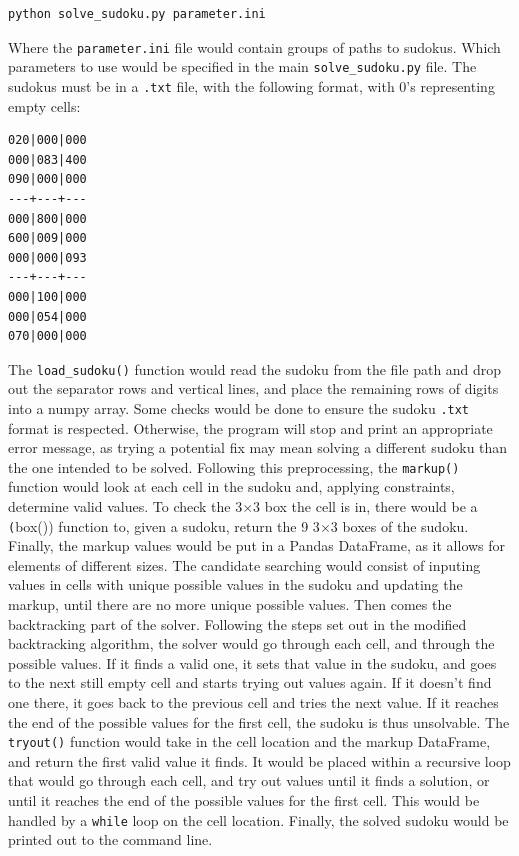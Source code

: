 \documentclass[12pt]{report} %
\begin{document}
\begin{lstlisting}[language=bash]
  python solve_sudoku.py parameter.ini
\end{lstlisting}

Where the \texttt{parameter.ini} file would contain groups of paths to sudokus. Which parameters to use would be specified in the main \texttt{solve\_sudoku.py} file. The sudokus must be in a \texttt{.txt} file, with the following format, with 0's representing empty cells:

\vspace*{1\baselineskip}
\begin{lstlisting}[caption = {Sudoku input format example}]
020|000|000
000|083|400
090|000|000
---+---+---
000|800|000
600|009|000
000|000|093
---+---+---
000|100|000
000|054|000
070|000|000
\end{lstlisting}

\vspace*{1\baselineskip}
The \texttt{load\_sudoku()} function would read the sudoku from the file path and drop out the separator rows and vertical lines, and place the remaining rows of digits into a numpy array. Some checks would be done to ensure the sudoku \texttt{.txt} format is respected. Otherwise, the program will stop and print an appropriate error message, as trying a potential fix may mean solving a different sudoku than the one intended to be solved.
Following this preprocessing, the \texttt{markup()} function would look at each cell in the sudoku and, applying constraints, determine valid values. To check the 3$\times$3 box the cell is in, there would be a \texttt(box()) function to, given a sudoku, return the 9 3$\times$3 boxes of the sudoku. Finally, the markup values would be put in a Pandas DataFrame, as it allows for elements of different sizes.
The candidate searching would consist of inputing values in cells with unique possible values in the sudoku and updating the markup, until there are no more unique possible values.
Then comes the backtracking part of the solver. Following the steps set out in the modified backtracking algorithm, the solver would go through each cell, and through the possible values. If it finds a valid one, it sets that value in the sudoku, and goes to the next still empty cell and starts trying out values again. If it doesn't find one there, it goes back to the previous cell and tries the next value. If it reaches the end of the possible values for the first cell, the sudoku is thus unsolvable. The \texttt{tryout()} function would take in the cell location and the markup DataFrame, and return the first valid value it finds. It would be placed within a recursive loop that would go through each cell, and try out values until it finds a solution, or until it reaches the end of the possible values for the first cell. This would be handled by a \texttt{while} loop on the cell location.
Finally, the solved sudoku would be printed out to the command line.
\end{document}
